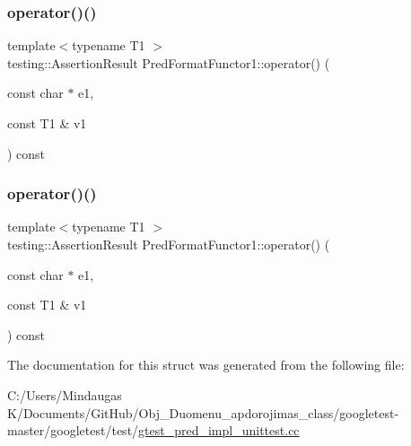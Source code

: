 \mbox{\label{struct_pred_format_functor1_ac2c414b5fa65b41b0ab5967f9f1e5bff}} 
\subsubsection{\texorpdfstring{operator()()}{operator()()}\hspace{0.1cm}{\footnotesize\ttfamily [2/3]}}
{\footnotesize\ttfamily template$<$typename T1 $>$ \\
testing\+::\+Assertion\+Result Pred\+Format\+Functor1\+::operator() (\begin{DoxyParamCaption}\item[{const char $\ast$}]{e1,  }\item[{const T1 \&}]{v1 }\end{DoxyParamCaption}) const\hspace{0.3cm}{\ttfamily [inline]}}

\mbox{\label{struct_pred_format_functor1_ac2c414b5fa65b41b0ab5967f9f1e5bff}} 
\subsubsection{\texorpdfstring{operator()()}{operator()()}\hspace{0.1cm}{\footnotesize\ttfamily [3/3]}}
{\footnotesize\ttfamily template$<$typename T1 $>$ \\
testing\+::\+Assertion\+Result Pred\+Format\+Functor1\+::operator() (\begin{DoxyParamCaption}\item[{const char $\ast$}]{e1,  }\item[{const T1 \&}]{v1 }\end{DoxyParamCaption}) const\hspace{0.3cm}{\ttfamily [inline]}}



The documentation for this struct was generated from the following file\+:\begin{DoxyCompactItemize}
\item 
C\+:/\+Users/\+Mindaugas K/\+Documents/\+Git\+Hub/\+Obj\+\_\+\+Duomenu\+\_\+apdorojimas\+\_\+class/googletest-\/master/googletest/test/\mbox{\hyperlink{googletest-master_2googletest_2test_2gtest__pred__impl__unittest_8cc}{gtest\+\_\+pred\+\_\+impl\+\_\+unittest.\+cc}}\end{DoxyCompactItemize}
